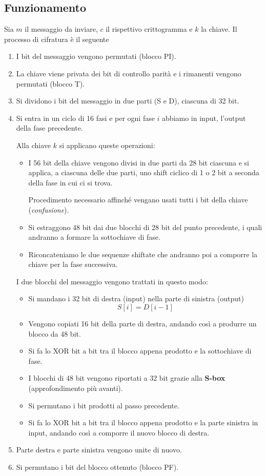 \subsection{Funzionamento}\label{funzionamento_DES}
Sia $m$ il messaggio da inviare, $c$ il rispettivo crittogramma e $k$ la chiave. Il processo di cifratura \`e il seguente
\begin{enumerate}
	\item I bit del messaggio vengono permutati (blocco PI).
	\item La chiave viene privata dei bit di controllo parit\`a e i rimanenti vengono permutati (blocco T).
	\item Si dividono i bit del messaggio in due parti (S e D), ciascuna di 32 bit.
	\item Si entra in un ciclo di 16 fasi e per ogni fase $i$ abbiamo in input, l'output della fase precedente.

	      Alla chiave $k$ si applicano queste operazioni:
	      \begin{itemize}
		      \item I 56 bit della chiave vengono divisi in due parti da 28 bit ciascuna e si applica, a ciascuna delle
		            due parti, uno shift ciclico di 1 o 2 bit a seconda della fase in cui ci si trova.

		            Procedimento necessario affinch\'e vengano usati tutti i bit della chiave (\emph{confusione}).
		      \item Si estraggono 48 bit dai due blocchi di 28 bit del punto precedente, i quali andranno a formare la
		            sottochiave di fase.
		      \item Riconcateniamo le due sequenze shiftate che andranno poi a comporre la chiave per la fase
		            successiva.
	      \end{itemize}
	      I due blocchi del messaggio vengono trattati in questo modo:
	      \begin{itemize}
		      \item Si mandano i 32 bit di destra (input) nella parte di sinistra (output)
		            \[ S[i] = D[i-1] \]
		      \item Vengono copiati 16 bit della parte di destra, andando cos\`i a produrre un blocco da 48 bit.
		      \item Si fa lo XOR bit a bit tra il blocco appena prodotto e la sottochiave di fase.
		      \item I blocchi di 48 bit vengono riportati a 32 bit grazie alla \textbf{S-box} (approfondimento pi\`u
		            avanti).
		      \item Si permutano i bit prodotti al passo precedente.
		      \item Si fa lo XOR bit a bit tra il blocco appena prodotto e la parte sinistra in input, andando cos\`i
		            a comporre il nuovo blocco di destra.
	      \end{itemize}
	\item Parte destra e parte sinistra vengono unite di nuovo.
	\item Si permutano i bit del blocco ottenuto (blocco PF).
\end{enumerate}

